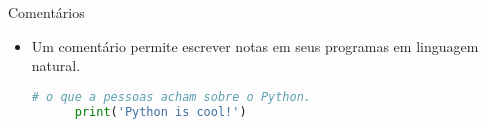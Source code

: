\begin{frame}[t, fragile]{Comentários}
  \begin{itemize}
    \item Um comentário permite escrever notas em seus programas em linguagem natural.
    \begin{lstlisting}[language=python]
      # o que a pessoas acham sobre o Python.
      print('Python is cool!')
    \end{lstlisting}
  \end{itemize}
\end{frame}
%
